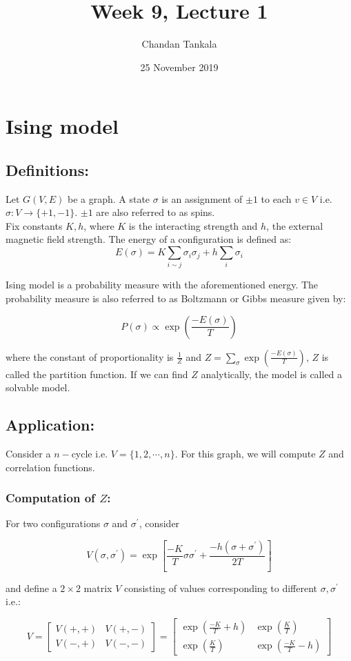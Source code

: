 \documentclass{article}
\title{Week 9, Lecture 1}
\author{Chandan Tankala}
\date{25 November 2019}
\begin{document}
\maketitle
\section{Ising model}
\subsection{Definitions:} 
Let $G(V,E)$ be a graph. A state $\sigma$ is an assignment of $\pm 1$ to each $v\in V$ i.e. $\sigma: V\to \{+1,-1\}$. $\pm 1$ are also referred to as spins.\\

Fix constants $K,h$, where $K$ is the interacting strength and $h$, the external magnetic field strength. The energy of a configuration is defined as: 
$$E(\sigma) = K\sum_{i\sim j}\sigma_i \sigma_j + h\sum_i \sigma_i$$

Ising model is a probability measure with the aforementioned energy. The probability measure is also referred to as Boltzmann or Gibbs measure given by:

$$P(\sigma)\propto \exp\left( \frac{-E(\sigma)}{T}\right)$$

where the constant of proportionality is $\frac{1}{Z}$ and $Z = \sum_{\sigma}\exp\left( \frac{-E(\sigma)}{T}\right)$, $Z$ is called the partition function. If we can find $Z$ analytically, the model is called a solvable model.

\subsection{Application:}
Consider a $n-$cycle i.e. $V=\{1,2,\cdots,n\}$. For this graph, we will compute $Z$ and correlation functions.

\subsubsection{Computation of $Z$:}
For two configurations $\sigma$ and $\sigma^{'}$, consider

$$V(\sigma,\sigma^{'}) = \exp \left[ \frac{-K}{T}\sigma\sigma^{'}+\frac{-h(\sigma+\sigma^{'})}{2T}\right]$$

and define a $2\times 2$ matrix $V$ consisting of values corresponding to different $\sigma,\sigma^{'}$ i.e.:

$$V = \begin{bmatrix} V(+,+) & V(+,-) \\ V(-,+) & V(-,-) \end{bmatrix} = \begin{bmatrix} \exp(\frac{-K}{T}+h) & \exp(\frac{K}{T}) \\\exp(\frac{K}{T}) & \exp(\frac{-K}{T}-h) \end{bmatrix}$$
\end{document}
